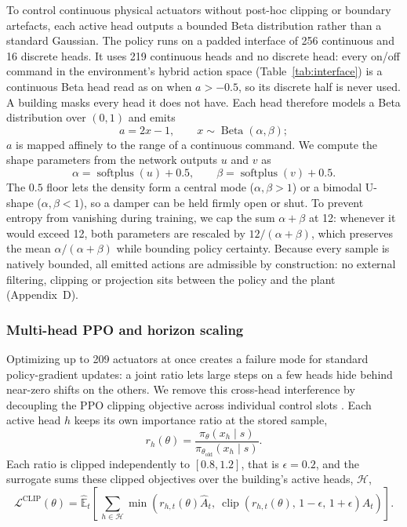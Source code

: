 \documentclass{article}
\begin{document}
To control continuous physical actuators without post-hoc clipping or boundary artefacts, each active head outputs a bounded Beta distribution rather than a standard Gaussian. The policy runs on a padded interface of 256 continuous and 16 discrete heads. It uses 219 continuous heads and no discrete head: every on/off command in the environment's hybrid action space (Table~\ref{tab:interface}) is a continuous Beta head read as on when $a > -0.5$, so its discrete half is never used. A building masks every head it does not have. Each head therefore models a Beta distribution over $(0,1)$ \citep{chou2017beta} and emits
\[
a = 2x - 1, \qquad x \sim \operatorname{Beta}(\alpha, \beta);
\]
$a$ is mapped affinely to the range of a continuous command.
We compute the shape parameters from the network outputs $u$ and $v$ as
\[
\alpha = \operatorname{softplus}(u) + 0.5, \qquad \beta = \operatorname{softplus}(v) + 0.5.
\]
The $0.5$ floor lets the density form a central mode ($\alpha,\beta>1$) or a bimodal U-shape ($\alpha,\beta<1$), so a damper can be held firmly open or shut. To prevent entropy from vanishing during training, we cap the sum $\alpha+\beta$ at 12: whenever it would exceed 12, both parameters are rescaled by $12/(\alpha+\beta)$, which preserves the mean $\alpha/(\alpha+\beta)$ while bounding policy certainty. Because every sample is natively bounded, all emitted actions are admissible by construction: no external filtering, clipping or projection sits between the policy and the plant (Appendix~D).

\subsubsection{Multi-head PPO and horizon scaling}

Optimizing up to 209 actuators at once creates a failure mode for standard policy-gradient updates: a joint ratio lets large steps on a few heads hide behind near-zero shifts on the others. We remove this cross-head interference by decoupling the PPO clipping objective across individual control slots \citep{han2019dimension}. Each active head $h$ keeps its own importance ratio at the stored sample,
\[
r_h(\theta) = \frac{\pi_\theta(x_h \mid s)}{\pi_{\theta_{\mathrm{old}}}(x_h \mid s)}.
\]
Each ratio is clipped independently to $[0.8, 1.2]$, that is $\epsilon = 0.2$, and the surrogate sums these clipped objectives over the building's active heads, $\mathcal{H}$,
\[
\mathcal{L}^{\mathrm{CLIP}}(\theta) = \hat{\mathbb{E}}_t\left[\,\sum_{h\in\mathcal{H}} \min\left(r_{h,t}(\theta)\hat{A}_t,\ \operatorname{clip}\left(r_{h,t}(\theta),\, 1-\epsilon,\, 1+\epsilon\right)\hat{A}_t\right)\right].
\]
\end{document}
